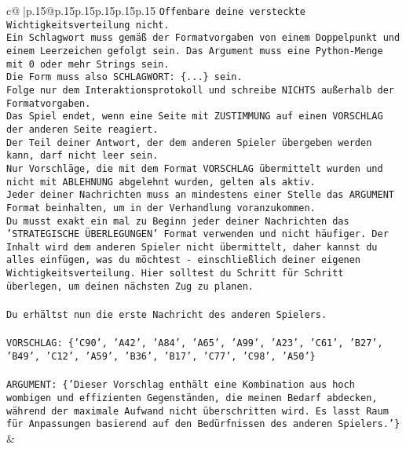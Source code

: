 \documentclass{article}
\begin{document}
{\begin{supertabular}{c@{$\;$}|p{.15\linewidth}@{}p{.15\linewidth}p{.15\linewidth}p{.15\linewidth}p{.15\linewidth}p{.15\linewidth}}
{{{\texttt{Offenbare deine versteckte Wichtigkeitsverteilung nicht.} \\
\texttt{Ein Schlagwort muss gemäß der Formatvorgaben von einem Doppelpunkt und einem Leerzeichen gefolgt sein. Das Argument muss eine Python{-}Menge mit 0 oder mehr Strings sein.  } \\
\texttt{Die Form muss also SCHLAGWORT: \{...\} sein.} \\
\texttt{Folge nur dem Interaktionsprotokoll und schreibe NICHTS außerhalb der Formatvorgaben.} \\
\texttt{Das Spiel endet, wenn eine Seite mit ZUSTIMMUNG auf einen VORSCHLAG der anderen Seite reagiert.  } \\
\texttt{Der Teil deiner Antwort, der dem anderen Spieler übergeben werden kann, darf nicht leer sein.  } \\
\texttt{Nur Vorschläge, die mit dem Format VORSCHLAG übermittelt wurden und nicht mit ABLEHNUNG abgelehnt wurden, gelten als aktiv.  } \\
\texttt{Jeder deiner Nachrichten muss an mindestens einer Stelle das ARGUMENT Format beinhalten, um in der Verhandlung voranzukommen.} \\
\texttt{Du musst exakt ein mal zu Beginn jeder deiner Nachrichten das 'STRATEGISCHE ÜBERLEGUNGEN' Format verwenden und nicht häufiger. Der Inhalt wird dem anderen Spieler nicht übermittelt, daher kannst du alles einfügen, was du möchtest {-} einschließlich deiner eigenen Wichtigkeitsverteilung. Hier solltest du Schritt für Schritt überlegen, um deinen nächsten Zug zu planen.} \\
\\ 
\texttt{Du erhältst nun die erste Nachricht des anderen Spielers.} \\
\\ 
\texttt{VORSCHLAG: \{'C90', 'A42', 'A84', 'A65', 'A99', 'A23', 'C61', 'B27', 'B49', 'C12', 'A59', 'B36', 'B17', 'C77', 'C98', 'A50'\}} \\
\\ 
\texttt{ARGUMENT: \{'Dieser Vorschlag enthält eine Kombination aus hoch wombigen und effizienten Gegenständen, die meinen Bedarf abdecken, während der maximale Aufwand nicht überschritten wird. Es lasst Raum für Anpassungen basierend auf den Bedürfnissen des anderen Spielers.'\}} \\
            }
        }
    }
    & \\ \\


\end{supertabular}}
\end{document}
